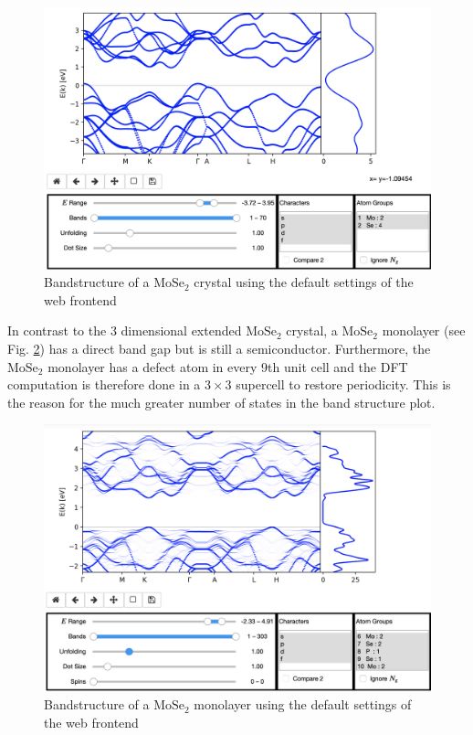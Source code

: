 \begin{figure}[htb!]
    \centering
    \includegraphics[width=0.7\linewidth]{christian/screen1.png}
    \caption[Bandstructure of a $\textrm{MoSe}_2$ crystal]{Bandstructure of a $\textrm{MoSe}_2$ crystal using the default settings of the web frontend}
    \label{example1}
\end{figure}

In contrast to the 3 dimensional extended $\textrm{MoSe}_2$ crystal, a $\textrm{MoSe}_2$ monolayer (see Fig. \ref{example2}) has a direct band gap but is still a semiconductor. Furthermore, the $\textrm{MoSe}_2$ monolayer has a defect atom in every 9th unit cell and the DFT computation is therefore done in a $3 \times 3$ supercell to restore periodicity. This is the reason for the much greater number of states in the band structure plot. 

\begin{figure}[htb!]
    \centering
    \includegraphics[width=0.7\linewidth]{christian/screen2.png}
    \caption[Bandstructure of a $\textrm{MoSe}_2$ monolayer]{Bandstructure of a $\textrm{MoSe}_2$ monolayer using the default settings of the web frontend}
    \label{example2}
\end{figure}


